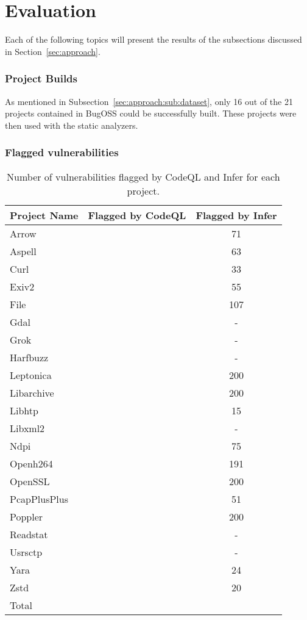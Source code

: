 \section{Evaluation}
\label{sec:eval}
Each of the following topics will present the results of the subsections discussed in Section~\ref{sec:approach}.

\subsubsection{Project Builds}
As mentioned in Subsection~\ref{sec:approach:sub:dataset}, only 16 out of the 21 projects contained in BugOSS could be successfully built. These projects were then used with the static analyzers.

\subsubsection{Flagged vulnerabilities}

\begin{table}[ht]
\centering
\caption{Number of vulnerabilities flagged by CodeQL and Infer for each project.}
\label{tab:sast_results}
\begin{tabular}{|l|c|c|}
\hline
\textbf{Project Name} & \textbf{Flagged by CodeQL} & \textbf{Flagged by Infer} \\
\hline
Arrow &  & 71 \\
Aspell &  & 63 \\
Curl &  & 33 \\
Exiv2 &  & 55 \\
File &  & 107 \\
Gdal &  & - \\
Grok &  & - \\
Harfbuzz &  & - \\
Leptonica &  & 200 \\
Libarchive &  & 200 \\
Libhtp &  & 15 \\
Libxml2 &  & - \\
Ndpi &  & 75 \\
Openh264 &  & 191 \\
OpenSSL &  & 200 \\
PcapPlusPlus &  & 51 \\
Poppler &  & 200 \\
Readstat &  & - \\
Usrsctp &  & - \\
Yara &  & 24 \\
Zstd &  & 20 \\
\hline
Total & \textbf{} & \textbf{} \\
\hline
\end{tabular}
\end{table}
